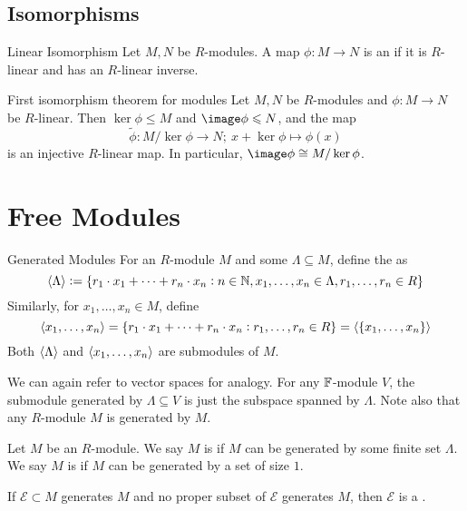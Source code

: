\documentclass{styles/tufte}
\begin{document}
  

\subsection{Isomorphisms}
  
  \begin{definition}{Linear Isomorphism}{}
    Let $M, N$ be $R$-modules. A map $\phi: M \to N$ is an  if it is $R$-linear and has an $R$-linear inverse.
  \end{definition}
  
  \begin{theorem}{First isomorphism theorem for modules}{}
    Let $M, N$ be $R$-modules and $\phi: M \to N$ be $R$-linear. Then $\ker\phi \leqslant M$ and $\image\phi \leqslant N$, and the map
    \[ \tilde{\phi}: M/\ker\phi \to N;\ x + \ker\phi \mapsto \phi(x) \]
    is an injective $R$-linear map. In particular, $\image\phi \cong M/\ker\phi$.
  \end{theorem}




\section{Free Modules}

\begin{definition}{Generated Modules}{}
  For an $R$-module $M$ and some $\Lambda \subseteq M$, define the  as
  \[ \langle \Lambda \rangle := \set{r_1 \cdot x_1 + \dots + r_n \cdot x_n: n \in \mathbb{N}, x_1, \dots, x_n \in \Lambda, r_1, \dots, r_n \in R} \]
  Similarly, for $x_1, \dots, x_n \in M$, define
  \[ \langle x_1, \dots, x_n \rangle = \set{r_1 \cdot x_1 + \dots + r_n \cdot x_n: r_1, \dots, r_n \in R} = \langle \set{x_1, \dots, x_n} \rangle \]
  Both $\langle \Lambda \rangle$ and $\langle x_1, \dots, x_n \rangle$ are submodules of $M$.
\end{definition}

We can again refer to vector spaces for analogy. For any $\mathbb{F}$-module $V$, the submodule generated by $\Lambda \subseteq V$ is just the subspace spanned by $\Lambda$. Note also that any $R$-module $M$ is generated by $M$.

\begin{definition}{}{}
  Let $M$ be an $R$-module. We say $M$ is  if $M$ can be generated by some finite set $\Lambda$. We say $M$ is  if $M$ can be generated by a set of size $1$.
  
  If $\mathcal{E} \subset M$ generates $M$ and no proper subset of $\mathcal{E}$ generates $M$, then $\mathcal{E}$ is a .
\end{definition}
\end{document}
